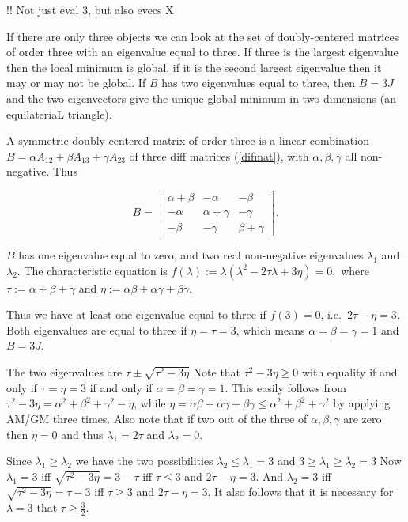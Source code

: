 \documentclass[
  12pt,
]{book}
\theoremstyle{definition}
\theoremstyle{definition}
\theoremstyle{definition}
\theoremstyle{definition}
\theoremstyle{remark}
\begin{document}
!! Not just eval 3, but also evecs X

If there are only three objects we can look at the set of doubly-centered matrices of order three with an eigenvalue equal to three. If three is the largest eigenvalue then the local minimum is global, if it is the second largest eigenvalue then it may or may not be global. If \(B\) has two eigenvalues equal to three, then \(B=3J\) and the two eigenvectors give the unique global minimum in two dimensions (an equilateriaL triangle).

A symmetric doubly-centered matrix of order three is a linear combination \(B=\alpha A_{12}+\beta A_{13}+\gamma A_{23}\)
of three diff matrices (\ref{difmat}), with \(\alpha, \beta, \gamma\) all non-negative. Thus

\begin{equation}
B=\begin{bmatrix}
\alpha+\beta&-\alpha&-\beta\\
-\alpha&\alpha+\gamma&-\gamma\\
-\beta&-\gamma&\beta+\gamma
\end{bmatrix}.
\label{eq:bgeneral}
\end{equation}

\(B\) has one eigenvalue equal to zero, and two real non-negative eigenvalues \(\lambda_1\) and \(\lambda_2\). The characteristic equation is
\(f(\lambda):=\lambda(\lambda^2-2\tau\lambda+3\eta)=0,\)
where \(\tau:=\alpha+\beta+\gamma\) and
\(\eta:=\alpha\beta+\alpha\gamma+\beta\gamma.\)

Thus we have at least one eigenvalue equal to three if \(f(3)=0\), i.e.~\(2\tau-\eta=3\). Both eigenvalues are equal to three if \(\eta=\tau=3\), which means \(\alpha=\beta=\gamma=1\) and \(B=3J\).

The two eigenvalues are \(\tau\pm\sqrt{\tau^2-3\eta}\)
Note that \(\tau^2-3\eta\geq 0\) with equality if and only if
\(\tau=\eta=3\) if and only if \(\alpha=\beta=\gamma=1\). This easily follows from \(\tau^2-3\eta=\alpha^2+\beta^2+\gamma^2-\eta\), while
\(\eta=\alpha\beta+\alpha\gamma+\beta\gamma\leq\alpha^2+\beta^2+\gamma^2\) by applying AM/GM three times. Also note that if two out of the three of
\(\alpha,\beta,\gamma\) are zero then \(\eta=0\) and thus \(\lambda_1=2\tau\)
and \(\lambda_2=0\).

Since \(\lambda_1\geq\lambda_2\) we have the two possibilities \(\lambda_2\leq\lambda_1=3\)
and \(3\geq\lambda_1\geq\lambda_2=3\)
Now \(\lambda_1=3\) iff \(\sqrt{\tau^2-3\eta}=3-\tau\) iff \(\tau\leq 3\) and \(2\tau-\eta=3\). And \(\lambda_2=3\) iff \(\sqrt{\tau^2-3\eta}=\tau-3\) iff \(\tau\geq 3\) and \(2\tau-\eta=3\). It also follows that it is necessary for
\(\lambda=3\) that \(\tau\geq\frac32\).
\end{document}
